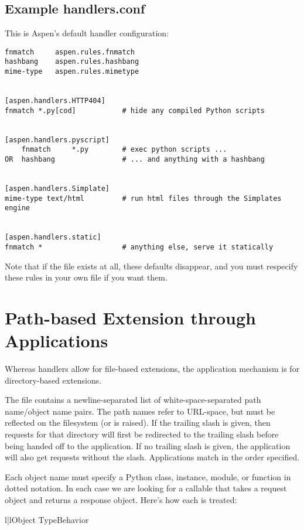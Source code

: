 \subsection{Example handlers.conf \label{handlers.conf}}
This is Aspen's default handler configuration:

\begin{verbatim}
fnmatch     aspen.rules.fnmatch
hashbang    aspen.rules.hashbang
mime-type   aspen.rules.mimetype


[aspen.handlers.HTTP404]
fnmatch *.py[cod]           # hide any compiled Python scripts


[aspen.handlers.pyscript]
    fnmatch     *.py        # exec python scripts ...
OR  hashbang                # ... and anything with a hashbang


[aspen.handlers.Simplate]
mime-type text/html         # run html files through the Simplates engine


[aspen.handlers.static]
fnmatch *                   # anything else, serve it statically
\end{verbatim}

Note that if the file  exists at all, these defaults
disappear, and you must respecify these rules in your own file if you want them.

\section{Path-based Extension through Applications}

Whereas handlers allow for file-based extensions, the application mechanism is
for directory-based extensions.

The  file contains a newline-separated list of
white-space-separated path name/object name pairs. The path names refer to
URL-space, but must be reflected on the filesystem (or  is
raised). If the trailing slash is given, then requests for that directory will
first be redirected to the trailing slash before being handed off to the
application. If no trailing slash is given, the application will also get
requests without the slash. Applications match in the order specified.

Each object name must specify a Python class, instance, module, or
function in dotted notation. In each case we are looking for a callable
that takes a request object and returns a response object. Here's how
each is treated:

\begin{tableii}{l|l}{}{Object Type}{Behavior}
\end{tableii}


